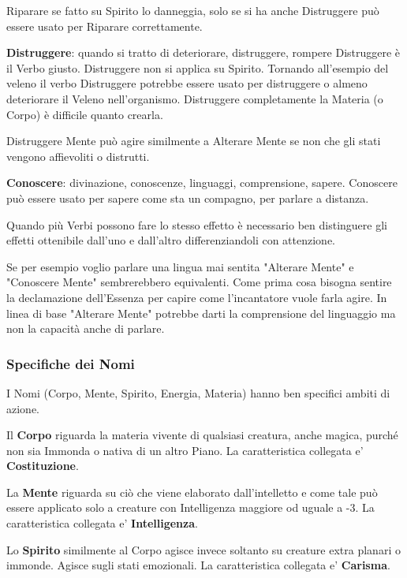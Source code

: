 \documentclass[a4paper,twoside,openany]{book}
\begin{document}
\begin{multicols}{2}
Riparare se fatto su Spirito lo danneggia, solo se si ha anche Distruggere può essere usato per Riparare correttamente.

\textbf{Distruggere}: quando si tratto di deteriorare, distruggere, rompere Distruggere è il Verbo giusto. Distruggere non si applica su Spirito.
Tornando all'esempio del veleno il verbo Distruggere potrebbe essere usato per distruggere o almeno deteriorare il Veleno nell'organismo. Distruggere completamente la Materia (o Corpo) è difficile quanto crearla.

Distruggere Mente può agire similmente a Alterare Mente se non che gli stati vengono affievoliti o distrutti.

\textbf{Conoscere}: divinazione, conoscenze, linguaggi, comprensione, sapere. Conoscere può essere usato per sapere come sta un compagno, per parlare a distanza.

Quando più Verbi possono fare lo stesso effetto è necessario ben distinguere gli effetti ottenibile dall'uno e dall'altro differenziandoli con attenzione. 

Se per esempio voglio parlare una lingua mai sentita "Alterare Mente" e "Conoscere Mente" sembrerebbero equivalenti.
Come prima cosa bisogna sentire la declamazione dell'Essenza per capire come l'incantatore vuole farla agire. In linea di base "Alterare Mente" potrebbe darti la comprensione del linguaggio ma non la capacità anche di parlare.


\subsubsection{Specifiche dei Nomi}

\label{Specifiche dei Nomi}

I Nomi (Corpo, Mente, Spirito, Energia, Materia) hanno ben specifici ambiti di azione.

Il \textbf{Corpo} riguarda la materia vivente di qualsiasi creatura, anche magica, purché non sia Immonda o nativa di un altro Piano. La caratteristica collegata e' \textbf{Costituzione}.

La \textbf{Mente} riguarda su ciò che viene elaborato dall'intelletto e come tale può essere applicato solo a creature con Intelligenza maggiore od uguale a -3. La caratteristica collegata e' \textbf{Intelligenza}.

Lo \textbf{Spirito} similmente al Corpo agisce invece soltanto su creature extra planari o immonde. Agisce sugli stati emozionali. La caratteristica collegata e' \textbf{Carisma}.


\end{multicols}
\end{document}
